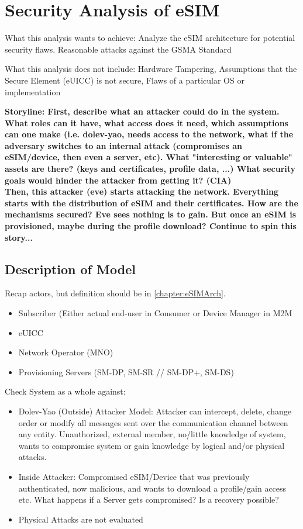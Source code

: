
\chapter{Security Analysis of eSIM}\label{chapter:secAnalysis}

What this analysis wants to achieve: Analyze the eSIM architecture for potential security flaws. Reasonable attacks against the GSMA Standard

What this analysis does not include: Hardware Tampering, Assumptions that the Secure Element (eUICC) is not secure, Flaws of a particular OS or implementation

\textbf{Storyline: First, describe what an attacker could do in the system. What roles can it have, what access does it need, which assumptions can one make (i.e. dolev-yao, needs access to the network, what if the adversary switches to an internal attack (compromises an eSIM/device, then even a server, etc). What "interesting or valuable" assets are there? (keys and certificates, profile data, ...) What security goals would hinder the attacker from getting it? (CIA) \\
Then, this attacker (eve) starts attacking the network. Everything starts with the distribution of eSIM and their certificates. How are the mechanisms secured? Eve sees nothing is to gain. But once an eSIM is provisioned, maybe during the profile download? Continue to spin this story...  }

\section{Description of Model}
Recap actors, but definition should be in \ref{chapter:eSIMArch}.
\begin{itemize}
    \item Subscriber (Either actual end-user in Consumer or Device Manager in M2M 
    \item eUICC
    \item Network Operator (MNO)
    \item Provisioning Servers (SM-DP, SM-SR // SM-DP+, SM-DS)
\end{itemize}

Check System as a whole against:
\begin{itemize}
    \item Dolev-Yao (Outside) Attacker Model: Attacker can intercept, delete, change order or modify all messages sent over the communication channel between any entity. Unauthorized, external member, no/little knowledge of system, wants to compromise system or gain knowledge by logical and/or physical attacks.
    \item Inside Attacker: Compromised eSIM/Device that was previously authenticated, now malicious, and wants to download a profile/gain access etc. What happens if a Server gets compromised? Is a recovery possible?
    \item Physical Attacks are not evaluated
\end{itemize}

